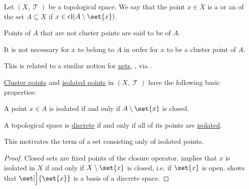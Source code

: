 \begin{definition}\label{def:set_cluster_point}
  Let \( (X, \mscrT) \) be a topological space. We say that the point \( x \in X \) is a  or an  of the set \( A \subseteq X \) if \( x \in \cl(A \setminus \set{ x }) \).

  Points of \( A \) that are not cluster points are said to be  of \( A \).

\end{definition}
\begin{comments}
  \item It is not necessary for \( x \) to belong to \( A \) in order for \( x \) to be a cluster point of \( A \).
  \item This is related to a similar notion for \hyperref[def:topological_net]{nets}, , via .
\end{comments}

\begin{proposition}\label{thm:def:set_cluster_point}
  \hyperref[def:set_cluster_point]{Cluster points} and \hyperref[def:set_cluster_point]{isolated points} in \( (X, \mscrT) \) have the following basic properties:
  \begin{thmenum}
     A point \( x \in A \) is isolated if and only if \( A \setminus \set{ x } \) is closed.

     A topological space is \hyperref[def:discrete_topology]{discrete} if and only if all of its points are \hyperref[def:set_cluster_point]{isolated}.

    This motivates the term  of a set consisting only of isolated points.
  \end{thmenum}
\end{proposition}
\begin{proof}
   Closed sets are fixed points of the closure operator.
    implies that \( x \) is isolated in \( X \) if and only if \( X \setminus \set{ x } \) is closed, i.e. if \( \set{ x } \) is open.  shows that \( \set[\Big]{ \set{ x } } \) is a basis of a discrete space.
\end{proof}

